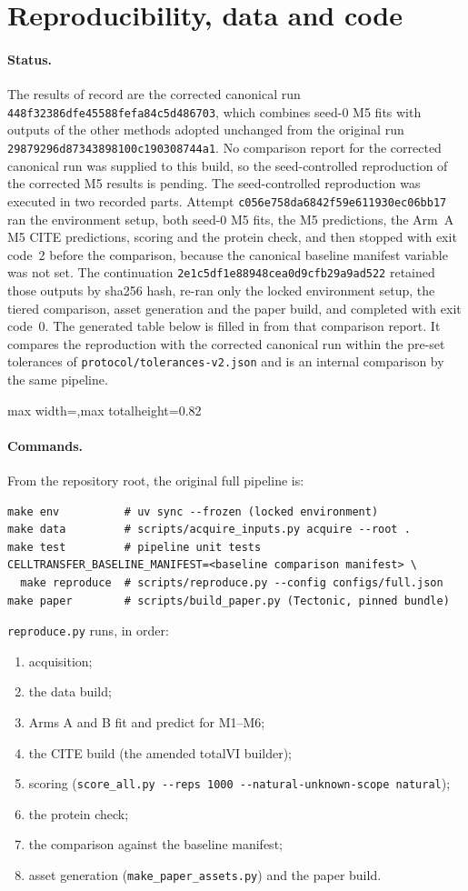 \documentclass[11pt]{article}
\newcommand{\gentable}[1]{\begin{adjustbox}{max width=\textwidth,max totalheight=0.82\textheight}\end{adjustbox}}
\newcommand{\runid}{\nolinkurl{448f32386dfe45588fefa84c5d486703}}
\newcommand{\origrunid}{\nolinkurl{29879296d87343898100c190308744a1}}
\newcommand{\cfailid}{\nolinkurl{c056e758da6842f59e611930ec06bb17}}
\newcommand{\ccontid}{\nolinkurl{2e1c5df1e88948cea0d9cfb29a9ad522}}
\newif\ifctreport
\newcommand{\Reprostatus}{\ifctreport A seed-controlled reproduction of the corrected M5 results was run and compared with the corrected canonical run by the repository's tiered comparison; that internal comparison reports overall status ``\ctres{comparison}{report}{overall}''. This is an internal tolerance comparison by the same pipeline, not independent verification\else No comparison report for the corrected canonical run was supplied to this build, so the seed-controlled reproduction of the corrected M5 results is pending\fi}
\begin{document}
\section{Reproducibility, data and code}\label{sec:repro}

\paragraph{Status.} The results of record are the corrected canonical run \runid, which combines seed-0 M5 fits with outputs of the other methods adopted unchanged from the original run \origrunid. \Reprostatus. The seed-controlled reproduction was executed in two recorded parts. Attempt \cfailid{} ran the environment setup, both seed-0 M5 fits, the M5 predictions, the Arm~A M5 CITE predictions, scoring and the protein check, and then stopped with exit code~2 before the comparison, because the canonical baseline manifest variable was not set. The continuation \ccontid{} retained those outputs by sha256 hash, re-ran only the locked environment setup, the tiered comparison, asset generation and the paper build, and completed with exit code~0. The generated table below is filled in from that comparison report. It compares the reproduction with the corrected canonical run within the pre-set tolerances of \nolinkurl{protocol/tolerances-v2.json} and is an internal comparison by the same pipeline.

\begin{table}[H]
\centering
\caption{Tiered reproduction comparison (generated). Without a comparison report, it states that none was supplied.}
\label{tab:repro}
\gentable{table_reproduction.tex}
\end{table}

\paragraph{Commands.} From the repository root, the original full pipeline is:
\begin{verbatim}
make env          # uv sync --frozen (locked environment)
make data         # scripts/acquire_inputs.py acquire --root .
make test         # pipeline unit tests
CELLTRANSFER_BASELINE_MANIFEST=<baseline comparison manifest> \
  make reproduce  # scripts/reproduce.py --config configs/full.json
make paper        # scripts/build_paper.py (Tectonic, pinned bundle)
\end{verbatim}
\texttt{reproduce.py} runs, in order:
\begin{enumerate}
\item acquisition;
\item the data build;
\item Arms A and B fit and predict for M1--M6;
\item the CITE build (the amended totalVI builder);
\item scoring (\verb|score_all.py --reps 1000 --natural-unknown-scope natural|);
\item the protein check;
\item the comparison against the baseline manifest;
\item asset generation (\nolinkurl{make_paper_assets.py}) and the paper build.
\end{enumerate}
\end{document}
